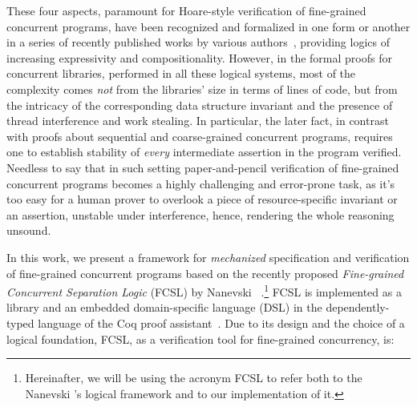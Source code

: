 \documentclass[blockstyle,preprint,nocopyrightspace]{sigplanconf}
\begin{document}
These four aspects, paramount for Hoare-style verification of
fine-grained concurrent programs, have been recognized and formalized
in one form or another in a series of recently published works by
various
authors~\cite{LeyWild-Nanevski:POPL13,Svendsen-al:ESOP13,Svendsen-Birkedal:ESOP14,Turon-al:ICFP13,Vafeiadis-Parkinson:CONCUR07,DinsdaleYoung-al:ECOOP10,ArrozPincho-al:ECOOP14,Jacobs-Piessens:POPL11,Feng-al:ESOP07,Feng:POPL09},
providing logics of increasing expressivity and compositionality.
% 
However, in the formal proofs for concurrent libraries, performed in
all these logical systems, most of the complexity comes \emph{not}
from the libraries' size in terms of lines of code, but from the
intricacy of the corresponding data structure invariant and the
presence of thread interference and work stealing. In particular, the
later fact, in contrast with proofs about sequential and
coarse-grained concurrent programs, requires one to establish
stability of \emph{every} intermediate assertion in the program
verified.
%
Needless to say that in such setting paper-and-pencil verification of
fine-grained concurrent programs becomes a highly challenging and
error-prone task, as it's too easy for a human prover to overlook a
piece of resource-specific invariant or an assertion, unstable under
interference, hence, rendering the whole reasoning unsound.

In this work, we present a framework for \emph{mechanized}
specification and verification of fine-grained concurrent programs
based on the recently proposed \emph{Fine-grained Concurrent
  Separation Logic} (FCSL) by Nanevski
\etal~\cite{Nanevski-al:ESOP14}.\footnote{Hereinafter, we will be
  using the acronym FCSL to refer both to the Nanevski \etal's logical
  framework and to our implementation of it.}
% 
FCSL is implemented as a library and an embedded domain-specific
language (DSL) in the dependently-typed language of the Coq proof
assistant~\cite{Coq-manual}.
%
Due to its design and the choice of a logical foundation, FCSL, as a
verification tool for fine-grained concurrency, is:
\end{document}

